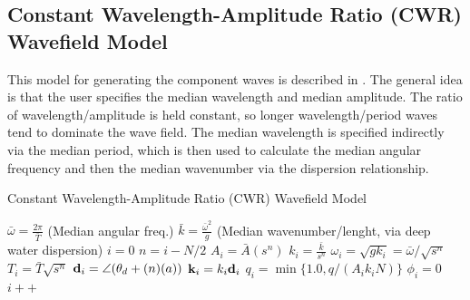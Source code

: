 \documentclass[11pt]{article}
\begin{document}
\subsection{Constant Wavelength-Amplitude Ratio (CWR) Wavefield Model}

This model for generating the component waves is described in \cite{gpugems_waves}.  The general idea is that the user specifies the median wavelength and median amplitude.  The ratio of wavelength/amplitude is held constant, so longer wavelength/period waves tend to dominate the wave field. The median wavelength is specified indirectly via the median period, which is then used to calculate the median angular frequency and then the median wavenumber via the dispersion relationship.

\begin{algorithm}
  \caption{Constant Wavelength-Amplitude Ratio (CWR) Wavefield Model}
  \begin{algorithmic}
    \STATE $\bar{\omega} = \frac{2 \pi}{\bar{T}}$ (Median angular freq.)
    \STATE $\bar{k}= \frac{\bar{\omega}^2}{g}$ (Median wavenumber/lenght, via deep water dispersion)
    \STATE $i = 0$
    \STATE $n=i - N/2$
    \STATE $A_i = \bar{A} (s^n)$
    \STATE $k_i = \frac{\bar{k}}{s^n}$
    \STATE $\omega_i = \sqrt{g k_i} = \bar{\omega}/ \sqrt{s^n}$
    \STATE $T_i = \bar{T} \sqrt{s^n}$
    \STATE $\mbox{${\bf d}_{i}$} = \angle{(\theta_d + (n)(a))}$
    \STATE $\mbox{${\bf k}_{i}$} = k_i \mbox{${\bf d}_{i}$}$
    \STATE $q_i = \min{\{1.0, q/(A_i k_i N)\}}$
    \STATE $\phi_i = 0$
    \STATE $i++$
    \ENDFOR
  \end{algorithmic}
\end{algorithm}

\newpage


\end{document}
